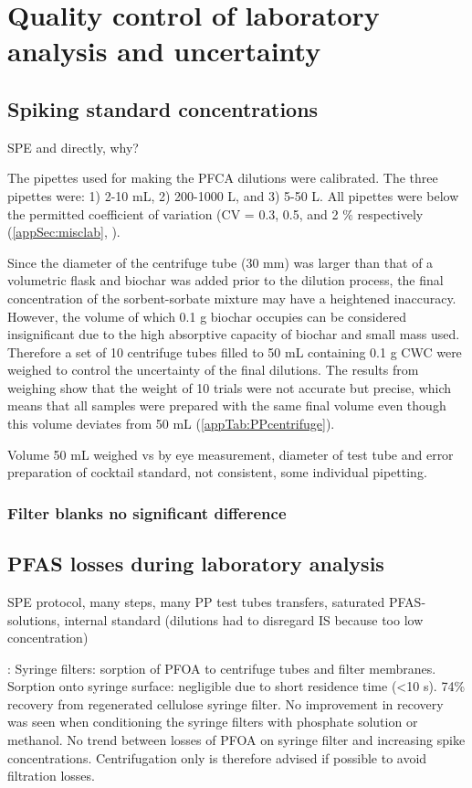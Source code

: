\section{Quality control of laboratory analysis and uncertainty}

\subsection{Spiking standard concentrations}
SPE and directly, why?

The pipettes used for making the PFCA dilutions were calibrated. The three pipettes were: 1) 2-10 mL, 2) 200-1000 \textmu L, and 3) 5-50 \textmu L. All pipettes were below the permitted coefficient of variation (CV = 0.3, 0.5, and 2 $\%$ respectively (\cref{appSec:misclab}, ).

Since the diameter of the centrifuge tube (30 mm) was larger than that of a volumetric flask and biochar was added prior to the dilution process, the final concentration of the sorbent-sorbate mixture may have a heightened inaccuracy. However, the volume of which 0.1 g biochar occupies can be considered insignificant due to the high absorptive capacity of biochar and small mass used. Therefore a set of 10 centrifuge tubes filled to 50 mL containing 0.1 g CWC were weighed to control the uncertainty of the final dilutions. The results from weighing show that the weight of 10 trials were not accurate but precise, which means that all samples were prepared with the same final volume even though this volume deviates from 50 mL (\cref{appTab:PPcentrifuge}). 

Volume 50 mL weighed vs by eye measurement, diameter of test tube and error
preparation of cocktail standard, not consistent, some individual pipetting. 

\subsubsection{Filter blanks no significant difference}

\subsection{PFAS losses during laboratory analysis}
SPE protocol, many steps, many PP test tubes transfers, saturated PFAS-solutions, internal standard (dilutions had to disregard IS because too low concentration)

\citep{Lath2019labsorb}: 
Syringe filters: sorption of PFOA to centrifuge tubes and filter membranes. Sorption onto syringe surface: negligible due to short residence time (\textless 10 s). 74\% recovery from regenerated cellulose syringe filter. No improvement in recovery was seen when conditioning the syringe filters with phosphate solution or methanol. No trend between losses of PFOA on syringe filter and increasing spike concentrations. Centrifugation only is therefore advised if possible to avoid filtration losses. 


